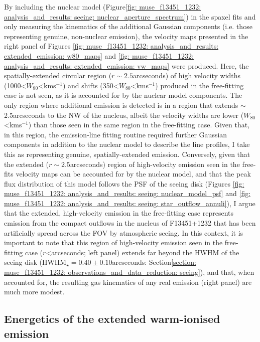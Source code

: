 By including the nuclear model (Figure\;\ref{fig: muse_f13451_1232: analysis_and_results: seeing: nuclear_aperture_spectrum}) in the spaxel fits and only measuring the kinematics of the additional Gaussian components (i.e. those representing genuine, non-nuclear emission), the velocity maps presented in the right panel of Figures \ref{fig: muse_f13451_1232: analysis_and_results: extended_emission: w80_maps} and \ref{fig: muse_f13451_1232: analysis_and_results: extended_emission: vw_maps} were produced. Here, the spatially-extended circular region ($r\sim2.5$\;arcseconds) of high velocity widths (1000\;\textless\;$W_\mathrm{80}$\;\textless{}\;km\;s$^{-1}$) and shifts (350\;\textless\;$W_\mathrm{80}$\;\textless{}\;km\;s$^{-1}$) produced in the free-fitting case is not seen, as it is accounted for by the nuclear model components. The only region where additional emission is detected is in a region that extends $\sim$2.5\;arcseconds to the NW of the nucleus, albeit the velocity widths are lower ($W_\mathrm{80}$\;\textless{}\;km\;s$^{-1}$) than those seen in the same region in the free-fitting case. Given that, in this region, the emission-line fitting routine required further Gaussian components in addition to the nuclear model to describe the line profiles, I take this as representing genuine, spatially-extended emission. Conversely, given that the extended ($r\sim2.5$\;arcseconds) region of high-velocity emission seen in the free-fits velocity maps can be accounted for by the nuclear model, and that the peak flux distribution of this model follows the PSF of the seeing disk (Figures \ref{fig: muse_f13451_1232: analysis_and_results: seeing: nuclear_model_psf} and \ref{fig: muse_f13451_1232: analysis_and_results: seeing: star_outflow_annuli}), I argue that the extended, high-velocity emission in the free-fitting case represents emission from the compact outflows in the nucleus of F13451+1232 that has been artificially spread across the FOV by atmospheric seeing. In this context, it is important to note that this region of high-velocity emission seen in the free-fitting case ($r$\;\textless{}\;arcseconds; left panel) extends far beyond the HWHM of the seeing disk (HWHM$_\star=0.40\pm0.10$\;arcseconds: Section\;\ref{section: muse_f13451_1232: observations_and_data_reduction: seeing}), and that, when accounted for, the resulting gas kinematics of any real emission (right panel) are much more modest. \\

\subsection{Energetics of the extended warm-ionised emission}
\label{section: muse_f13451_1232: analysis_and_results: extended_emission}

